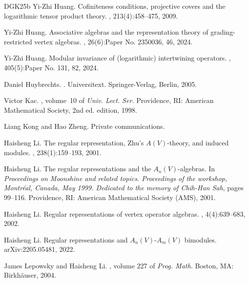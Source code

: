 \documentclass[11pt,b5paper,notitlepage]{article}
\theoremstyle{definition}
\theoremstyle{plain}
\newcommand{\<}{\left\langle}
\renewcommand{\>}{\right\rangle}
\numberwithin{equation}{section}
\begin{document}
\begin{thebibliography}{DGK25b}
Yi-Zhi Huang.
\newblock Cofiniteness conditions, projective covers and the logarithmic tensor
  product theory.
, 213(4):458--475, 2009.

Yi-Zhi Huang.
\newblock Associative algebras and the representation theory of
  grading-restricted vertex algebras.
, 26(6):Paper No. 2350036, 46, 2024.

Yi-Zhi Huang.
\newblock Modular invariance of (logarithmic) intertwining operators.
, 405(5):Paper No. 131, 82, 2024.

Daniel Huybrechts.
.
\newblock Universitext. Springer-Verlag, Berlin, 2005.

Victor Kac.
, volume~10 of {\em Univ. Lect.
  Ser.}
\newblock Providence, RI: American Mathematical Society, 2nd ed. edition, 1998.

Liang Kong and Hao Zheng.
\newblock Private communications.

Haisheng Li.
\newblock The regular representation, {Zhu}'s {{\(A(V)\)}}-theory, and induced
  modules.
, 238(1):159--193, 2001.

Haisheng Li.
\newblock The regular representations and the {{\(A_n(V)\)}}-algebras.
\newblock In {\em Proceedings on Moonshine and related topics. Proceedings of
  the workshop, Montr\'eal, Canada, May 1999. Dedicated to the memory of
  Chih-Han Sah}, pages 99--116. Providence, RI: American Mathematical Society
  (AMS), 2001.

Haisheng Li.
\newblock Regular representations of vertex operator algebras.
, 4(4):639--683, 2002.

Haisheng Li.
\newblock Regular representations and {$A_n(V)$-$A_m(V)$} bimodules.
\newblock arXiv:2205.05481, 2022.

James Lepowsky and Haisheng Li.
, volume 227 of {\em Prog. Math.}
\newblock Boston, MA: Birkh{\"a}user, 2004.


\end{thebibliography}
\end{document}
